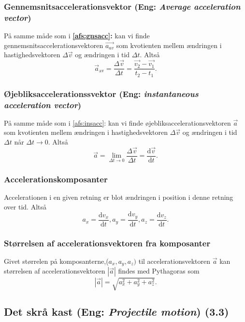 \subsubsection{Gennemsnitsaccelerationsvektor (Eng: \textit{Average acceleration vector})} \label{afs:gnsaccvec}
På samme måde som i \textbf{\ref{afs:gnsacc}: } kan vi finde gennemsnitsaccelerationsvektoren $\Vec{a_{av}}$ som kvotienten mellem ændringen i hastighedsvektoren $\Delta \Vec{v}$ og ændringen i tid $\Delta t$. Altså
\[ 
  \Vec{a}_{\text{av}} = \frac{\Delta \Vec{v}}{\Delta t} = \frac{\Vec{v_2} - \Vec{v_1}}{t_2 - t_1}
.\]


\subsubsection{Øjebliksaccelerationssvektor (Eng: \textit{instantaneous acceleration vector})} \label{afs:insaccvec}
På samme måde som i \ref{afs:insacc}:  kan vi finde øjebliksaccelerationsvektoren $\Vec{a}$ som kvotienten mellem ændringen i hastighedsvektoren $\Delta \Vec{v}$ og ændringen i tid $\Delta t$ når $\Delta t \to 0$. Altså
\[ 
  \Vec{a} = \lim_{\Delta t \to 0} \frac{\Delta \Vec{v}}{\Delta t} = \frac{\mathrm{d}\Vec{v}}{\mathrm{d}t}
.\]

\subsubsection{Accelerationskomposanter} \label{afs:acckom}
Accelerationen i en given retning er blot ændringen i position i denne retning over tid. Altså
\[ 
    a_x = \frac{\mathrm{d}v_x}{\mathrm{d}t}, a_y = \frac{\mathrm{d}v_y}{\mathrm{d}t}, a_z = \frac{\mathrm{d}v_z}{\mathrm{d}t}
  .\]

\subsubsection{Størrelsen af accelerationsvektoren fra komposanter} \label{afs:komacc}
Givet størrelen på komposanterne,($a_x, a_y, a_z)$ til accelerationsvektoren $\Vec{a}$ kan størrelsen af accelerationsvektoren $\left| \Vec{a} \right|$ findes med Pythagoras som
\[ 
  \left| \Vec{a} \right| = \sqrt{a_x^2 + a_y^2 + a_z^2}
.\]


\subsection{Det skrå kast (Eng: \textit{Projectile motion}) (3.3)}

